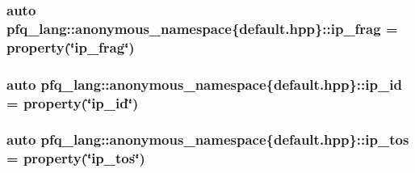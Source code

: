 \hypertarget{namespacepfq__lang_1_1anonymous__namespace_02default_8hpp_03_a29f207a5d209c3968f5d2e8f3c19c239}{
\subsubsection[{ip\-\_\-frag}]{\setlength{\rightskip}{0pt plus 5cm}auto pfq\-\_\-lang\-::anonymous\-\_\-namespace\{default.\-hpp\}\-::ip\-\_\-frag = {\bf property}(\char`\"{}ip\-\_\-frag\char`\"{})}}\label{namespacepfq__lang_1_1anonymous__namespace_02default_8hpp_03_a29f207a5d209c3968f5d2e8f3c19c239}
\hypertarget{namespacepfq__lang_1_1anonymous__namespace_02default_8hpp_03_a7e1fd2e2131451ca8afe2f8ab07b97a8}{
\subsubsection[{ip\-\_\-id}]{\setlength{\rightskip}{0pt plus 5cm}auto pfq\-\_\-lang\-::anonymous\-\_\-namespace\{default.\-hpp\}\-::ip\-\_\-id = {\bf property}(\char`\"{}ip\-\_\-id\char`\"{})}}\label{namespacepfq__lang_1_1anonymous__namespace_02default_8hpp_03_a7e1fd2e2131451ca8afe2f8ab07b97a8}
\hypertarget{namespacepfq__lang_1_1anonymous__namespace_02default_8hpp_03_afc29e9877341008196788bba2bde3e04}{
\subsubsection[{ip\-\_\-tos}]{\setlength{\rightskip}{0pt plus 5cm}auto pfq\-\_\-lang\-::anonymous\-\_\-namespace\{default.\-hpp\}\-::ip\-\_\-tos = {\bf property}(\char`\"{}ip\-\_\-tos\char`\"{})}}\label{namespacepfq__lang_1_1anonymous__namespace_02default_8hpp_03_afc29e9877341008196788bba2bde3e04}
